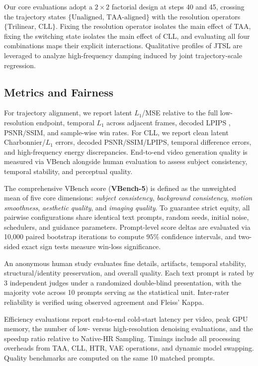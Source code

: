 Our core evaluations adopt a \(2\times2\) factorial design at steps 40
and 45, crossing the trajectory states
\(\{\text{Unaligned, TAA-aligned}\}\) with the resolution
operators \(\{\text{Trilinear, CLL}\}\). Fixing the
resolution operator isolates the main effect of TAA, fixing the
switching state isolates the main effect of CLL, and evaluating all four
combinations maps their explicit interactions. Qualitative profiles of
JTSL are leveraged to analyze high-frequency damping induced by joint
trajectory-scale regression.

\subsection{Metrics and Fairness}

For trajectory alignment, we report latent \(L_1\)/MSE relative to the
full low-resolution endpoint, temporal \(L_1\) across adjacent frames,
decoded LPIPS \citep{zhang2018lpips}, PSNR/SSIM, and sample-wise win
rates. For CLL, we report clean latent Charbonnier/\(L_1\) errors,
decoded PSNR/SSIM/LPIPS, temporal difference errors, and high-frequency
energy discrepancies. End-to-end video generation quality is measured
via VBench \citep{huang2024vbench} alongside human evaluation to assess
subject consistency, temporal stability, and perceptual quality.

The comprehensive VBench score (\textbf{VBench-5}) is defined as the
unweighted mean of five core dimensions: \emph{subject consistency},
\emph{background consistency}, \emph{motion smoothness}, \emph{aesthetic
quality}, and \emph{imaging quality}. To guarantee strict equity, all
pairwise configurations share identical text prompts, random seeds,
initial noise, schedulers, and guidance parameters. Prompt-level score
deltas are evaluated via 10,000 paired bootstrap iterations to compute
\(95\%\) confidence intervals, and two-sided exact sign tests measure
win-loss significance.

An anonymous human study evaluates fine details, artifacts, temporal
stability, structural/identity preservation, and overall quality. Each
text prompt is rated by 3 independent judges under a randomized
double-blind presentation, with the majority vote across 10 prompts
serving as the statistical unit. Inter-rater reliability is verified
using observed agreement and Fleiss' Kappa.

Efficiency evaluations report end-to-end cold-start latency per video,
peak GPU memory, the number of low- versus high-resolution denoising
evaluations, and the speedup ratio relative to Native-HR Sampling.
Timings include all processing overheads from TAA, CLL, HTR, VAE
operations, and dynamic model swapping. Quality benchmarks are computed
on the same 10 matched prompts.

